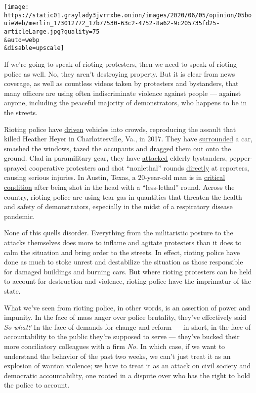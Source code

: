 \texttt{[image: https://static01.graylady3jvrrxbe.onion/images/2020/06/05/opinion/05bouieWeb/merlin\_173012772\_17b77530-63c2-4752-8a62-9c205735fd25-articleLarge.jpg?quality=75\\\&auto=webp\\\&disable=upscale]}

If we're going to speak of rioting protesters, then we need to speak of
rioting police as well. No, they aren't destroying property. But it is
clear from news coverage, as well as countless videos taken by
protesters and bystanders, that many officers are using often
indiscriminate violence against people --- against anyone, including the
peaceful majority of demonstrators, who happens to be in the streets.

Rioting police have
\href{https://twitter.com/stevemullis/status/1266979219566989313}{driven}
vehicles into crowds, reproducing the assault that killed Heather Heyer
in Charlottesville, Va., in 2017. They have
\href{https://twitter.com/imactuallynina/status/1266912627193774080}{surrounded}
a car, smashed the windows, tazed the occupants and dragged them out
onto the ground. Clad in paramilitary gear, they have
\href{https://twitter.com/bubbaprog/status/1266908354821206016}{attacked}
elderly bystanders, pepper-sprayed cooperative protesters and shot
``nonlethal'' rounds
\href{https://www.nytimes3xbfgragh.onion/2020/05/30/us/minneapolis-protests-press.html}{directly}
at reporters, causing serious injuries. In Austin, Texas, a 20-year-old
man is in
\href{https://www.kxan.com/investigations/everything-we-know-about-the-teenager-officers-shot-in-the-head-with-less-lethal-round-at-austin-protest/}{critical
condition} after being shot in the head with a ``less-lethal'' round.
Across the country, rioting police are using tear gas in quantities that
threaten the health and safety of demonstrators, especially in the midst
of a respiratory disease pandemic.

None of this quells disorder. Everything from the militaristic posture
to the attacks themselves does more to inflame and agitate protesters
than it does to calm the situation and bring order to the streets. In
effect, rioting police have done as much to stoke unrest and destabilize
the situation as those responsible for damaged buildings and burning
cars. But where rioting protesters can be held to account for
destruction and violence, rioting police have the imprimatur of the
state.

What we've seen from rioting police, in other words, is an assertion of
power and impunity. In the face of mass anger over police brutality,
they've effectively said \emph{So what?} In the face of demands for
change and reform --- in short, in the face of accountability to the
public they're supposed to serve --- they've bucked their more
conciliatory colleagues with a firm \emph{No.} In which case, if we want
to understand the behavior of the past two weeks, we can't just treat it
as an explosion of wanton violence; we have to treat it as an attack on
civil society and democratic accountability, one rooted in a dispute
over who has the right to hold the police to account.

